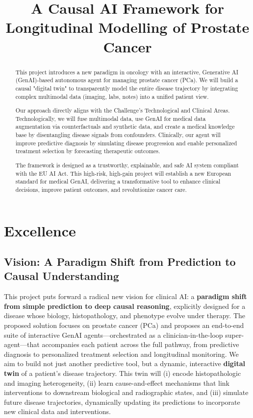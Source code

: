 \documentclass[11pt, a4paper]{article}
\title{A Causal AI Framework for Longitudinal Modelling of Prostate Cancer}
\author{}
\date{}
\begin{document}
\maketitle

\begin{abstract}
This project introduces a new paradigm in oncology with an interactive, Generative AI (GenAI)-based autonomous agent for managing prostate cancer (PCa). We will build a causal "digital twin" to transparently model the entire disease trajectory by integrating complex multimodal data (imaging, labs, notes) into a unified patient view.

Our approach directly aligns with the Challenge's Technological and Clinical Areas. Technologically, we will fuse multimodal data, use GenAI for medical data augmentation via counterfactuals and synthetic data, and create a medical knowledge base by disentangling disease signals from confounders. Clinically, our agent will improve predictive diagnosis by simulating disease progression and enable personalized treatment selection by forecasting therapeutic outcomes.

The framework is designed as a trustworthy, explainable, and safe AI system compliant with the EU AI Act. This high-risk, high-gain project will establish a new European standard for medical GenAI, delivering a transformative tool to enhance clinical decisions, improve patient outcomes, and revolutionize cancer care.
\end{abstract}

\section{Excellence}

\subsection{Vision: A Paradigm Shift from Prediction to Causal Understanding}
This project puts forward a radical new vision for clinical AI: a \textbf{paradigm shift from simple prediction to deep causal reasoning}, explicitly designed for a disease whose biology, histopathology, and phenotype evolve under therapy. The proposed solution focuses on prostate cancer (PCa) and proposes an end-to-end suite of interactive GenAI agents—orchestrated as a clinician-in-the-loop super-agent—that accompanies each patient across the full pathway, from predictive diagnosis to personalized treatment selection and longitudinal monitoring. We aim to build not just another predictive tool, but a dynamic, interactive \textbf{digital twin} of a patient’s disease trajectory. This twin will (i) encode histopathologic and imaging heterogeneity, (ii) learn cause-and-effect mechanisms that link interventions to downstream biological and radiographic states, and (iii) simulate future disease trajectories, dynamically updating its predictions to incorporate new clinical data and interventions.
\end{document}
